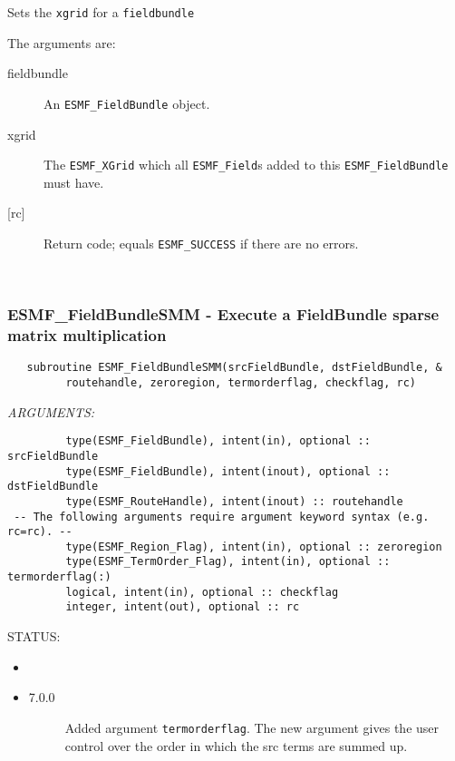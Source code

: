    \begin{sloppypar}
   Sets the {\tt xgrid} for a {\tt fieldbundle}
   \end{sloppypar}
  
   The arguments are:
   \begin{description}
   \item [fieldbundle]
   An {\tt ESMF\_FieldBundle} object.
   \item [xgrid]
   The {\tt ESMF\_XGrid} which all {\tt ESMF\_Field}s added to this
   {\tt ESMF\_FieldBundle} must have.
   \item [{[rc]}]
   Return code; equals {\tt ESMF\_SUCCESS} if there are no errors.
   \end{description}
  
   
 
\mbox{}\hrulefill\ 
 
\subsubsection [ESMF\_FieldBundleSMM] {ESMF\_FieldBundleSMM - Execute a FieldBundle sparse matrix multiplication}


  
\begin{verbatim}   subroutine ESMF_FieldBundleSMM(srcFieldBundle, dstFieldBundle, &
         routehandle, zeroregion, termorderflag, checkflag, rc)\end{verbatim}{\em ARGUMENTS:}
\begin{verbatim}         type(ESMF_FieldBundle), intent(in), optional :: srcFieldBundle
         type(ESMF_FieldBundle), intent(inout), optional :: dstFieldBundle
         type(ESMF_RouteHandle), intent(inout) :: routehandle
 -- The following arguments require argument keyword syntax (e.g. rc=rc). --
         type(ESMF_Region_Flag), intent(in), optional :: zeroregion
         type(ESMF_TermOrder_Flag), intent(in), optional :: termorderflag(:)
         logical, intent(in), optional :: checkflag
         integer, intent(out), optional :: rc\end{verbatim}
{\sf STATUS:}
   \begin{itemize}
   \item{}
   \item{}
   \begin{description}
   \item[7.0.0] Added argument {\tt termorderflag}.
   The new argument gives the user control over the order in which
   the src terms are summed up.
   \end{description}
   \end{itemize}
  
